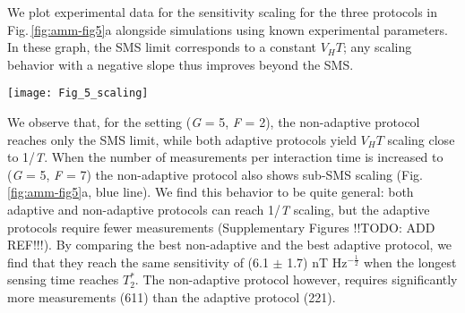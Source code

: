 We plot experimental data for the sensitivity scaling for the three protocols in Fig.\,\ref{fig:amm-fig5}a alongside simulations using known experimental parameters. In these graph, the SMS limit corresponds to a constant $V_H T$; any scaling behavior with a negative slope thus improves beyond the SMS.

\begin{figure*}
	\centering
	\texttt{[image: Fig\_5\_scaling]}
	\caption{\label{fig:amm-fig5} \textbf{Scaling of sensitivity as a function of total time.} (a) The three protocols are compared by plotting $\eta^2 - V_H T$  as a function of the total sensing time \textit{T} (not including spin initialization and readout). For (\textit{G} = 5, \textit{F} = 2) the non-adaptive protocol (green triangles) is bound to the SMS limit, while for both the limited-adaptive (orange circles) and the optimized adaptive (red triangles) protocols $\eta^2$ scales close to 1/\textit{T}. The sensitivity of the limited-adaptive protocol is, however, worse than the optimized-adaptive one. When increasing the number of Ramsey experiments per sensing time to (\textit{G} = 5, \textit{F} = 7), the non-adaptive protocol (blue triangles) reaches Heisenberg-like scaling, with a sensitivity comparable to the optimized adaptive protocol for (\textit{G}=5, \textit{F}=2). (b) By including spin initialization and readout durations, the superiority of the optimized adaptive protocol (red triangles), which requires less Ramsey runs per sensing time (smaller \textit{F}, \textit{G}) to reach 1/\textit{T} scaling, is evidenced. The optimized adaptive protocol can estimate magnetic fields with a repetition rate of 20 Hz, with a sensitivity more than one order of magnitude better than the non-adaptive protocol. All data are taken with 700 repetitions per data-point. In both plots, error bars corresponding to one standard deviation of the results are obtained using the bootstrap method.}
\end{figure*}


We observe that, for the setting (\textit{G} = 5, \textit{F} = 2), the non-adaptive protocol reaches only the SMS limit, while both adaptive protocols yield $V_H T$ scaling close to 1/\textit{T}. When the number of measurements per interaction time is increased to (\textit{G} = 5, \textit{F} = 7) the non-adaptive protocol also shows sub-SMS scaling (Fig.\,\ref{fig:amm-fig5}a, blue line). We find this behavior to be quite general: both adaptive and non-adaptive protocols can reach 1/\textit{T} scaling, but the adaptive protocols require fewer measurements (Supplementary Figures !!TODO: ADD REF!!!). By comparing the best non-adaptive and the best adaptive protocol, we find that they reach the same sensitivity of (6.1 $\pm$ 1.7) nT Hz$^{-\frac{1}{2}}$ when the longest sensing time reaches $T_2^*$. The non-adaptive protocol however, requires significantly more measurements (611) than the adaptive protocol (221).


